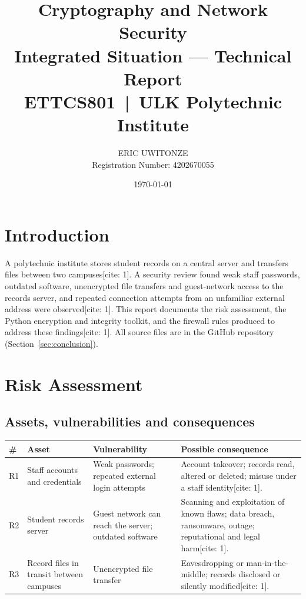 \documentclass[11pt,a4paper]{article}
\title{Cryptography and Network Security\\ \large Integrated Situation --- Technical Report\\
        \normalsize ETTCS801 \,|\, ULK Polytechnic Institute}
\author{ERIC UWITONZE \\ Registration Number: 4202670055}
\date{\today}
\begin{document}
\maketitle
\tableofcontents
\bigskip

\section{Introduction}
A polytechnic institute stores student records on a central server and transfers files between two campuses[cite: 1].
A security review found weak staff passwords, outdated software, unencrypted file transfers and guest-network
access to the records server, and repeated connection attempts from an unfamiliar external address were observed[cite: 1].
This report documents the risk assessment, the Python encryption and integrity toolkit, and the firewall
rules produced to address these findings[cite: 1]. All source files are in the GitHub repository (Section~\ref{sec:conclusion}).

\section{Risk Assessment}
\subsection{Assets, vulnerabilities and consequences}
\begin{longtable}{@{}p{0.3cm}p{3.3cm}p{4.2cm}p{6.3cm}@{}}
\toprule
\# & Asset & Vulnerability & Possible consequence\\ \midrule\endhead
R1 & Staff accounts and credentials & Weak passwords; repeated external login attempts &
Account takeover; records read, altered or deleted; misuse under a staff identity[cite: 1].\\[4pt]
R2 & Student records server & Guest network can reach the server; outdated software &
Scanning and exploitation of known flaws; data breach, ransomware, outage; reputational and legal harm[cite: 1].\\[4pt]
R3 & Record files in transit between campuses & Unencrypted file transfer &
Eavesdropping or man-in-the-middle; records disclosed or silently modified[cite: 1].\\
\bottomrule
\end{longtable}
\end{document}
